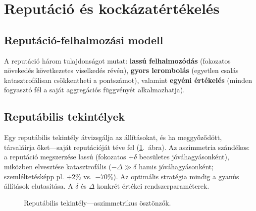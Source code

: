 \documentclass[11pt,a4paper,twocolumn]{article}
\begin{document}
\section{Reputáció és kockázatértékelés}

\subsection{Reputáció-felhalmozási modell}

A reputáció három tulajdonságot mutat: \textbf{lassú felhalmozódás} (fokozatos növekedés következetes viselkedés révén), \textbf{gyors lerombolás} (egyetlen csalás katasztrofálisan csökkentheti a pontszámot), valamint \textbf{egyéni értékelés} (minden fogyasztó fél a saját aggregációs függvényét alkalmazhatja).

\subsection{Reputábilis tekintélyek}

Egy reputábilis tekintély átvizsgálja az állításokat, és ha meggyőződött, társaláírja őket---saját reputációját téve fel (\ref{fig:authority}.~ábra). Az aszimmetria szándékos: a reputáció megszerzése lassú (fokozatos $+\delta$ becsületes jóváhagyásonként), miközben elvesztése katasztrofális ($-\Delta \gg \delta$ hamis jóváhagyásonként; szemléltetésképp pl. $+2\%$ vs.\ $-70\%$). Az optimális stratégia mindig a gyanús állítások elutasítása. A $\delta$ és $\Delta$ konkrét értékei rendszerparaméterek.

\begin{figure}[ht]
\centering
{}
\caption{Reputábilis tekintély---aszimmetrikus ösztönzők.}
\label{fig:authority}
\end{figure}
\end{document}
